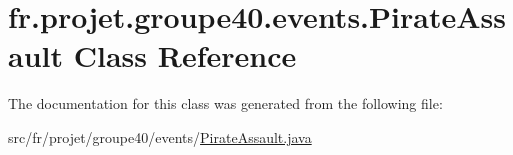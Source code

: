 \hypertarget{classfr_1_1projet_1_1groupe40_1_1events_1_1_pirate_assault}{}\section{fr.\+projet.\+groupe40.\+events.\+Pirate\+Assault Class Reference}
\label{classfr_1_1projet_1_1groupe40_1_1events_1_1_pirate_assault}


The documentation for this class was generated from the following file\+:\begin{DoxyCompactItemize}
\item 
src/fr/projet/groupe40/events/\hyperlink{_pirate_assault_8java}{Pirate\+Assault.\+java}\end{DoxyCompactItemize}
